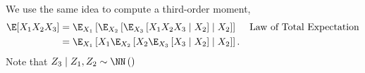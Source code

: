 \documentclass{article}
\begin{document}
We use the same idea to compute a third-order moment,
\begin{align}
  \E[ X_1 X_2 X_3 ]
  &= \E_{X_1}\left[ \E_{X_2} \left[ \E_{X_3}\left[ X_1 X_2 X_3 \mid X_2 \right] \mid X_2 \right] \right] && \text{Law of Total Expectation} \\
  &= \E_{X_1}\left[  X_1 \E_{X_2} \left[ X_2 \E_{X_3}\left[ X_3 \mid X_2 \right] \mid X_2 \right] \right].
\end{align}
Note that $Z_3 \mid Z_1, Z_2 \sim \NN \left(  \right)$
\end{document}
